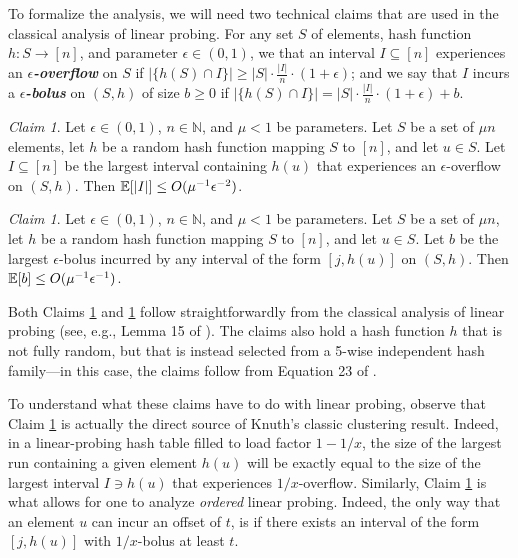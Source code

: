 \documentclass[10pt]{article}
\theoremstyle{remark}
\newtheorem{claim}[thm]{Claim}
\theoremstyle{remark}
\newcommand{\defn}[1]{\textbf{\emph{#1}}}
\begin{document}
To formalize the analysis, we will need two technical claims that are used in the classical analysis of linear probing. For any set $S$ of elements, hash function $h: S \rightarrow [n]$, and parameter $\epsilon \in (0, 1)$, we that an interval $I \subseteq [n]$ experiences an \defn{$\epsilon$-overflow} on $S$ if $|\{h(S) \cap I\}| \ge |S| \cdot \frac{|I|}{n} \cdot (1 + \epsilon)$; and we say that $I$ incurs a \defn{$\epsilon$-bolus} on $(S, h)$ of size $b \ge 0$ if $|\{h(S) \cap I\}| = |S| \cdot \frac{|I|}{n} \cdot (1 + \epsilon) + b$.


\begin{claim}
Let $\epsilon \in (0, 1)$, $n \in \mathbb{N}$, and $\mu < 1$ be parameters. Let $S$ be a set of $\mu n$ elements, let $h$ be a random hash function mapping $S$ to $[n]$, and let $u \in S$. Let $I \subseteq [n]$ be the largest interval containing $h(u)$ that experiences an $\epsilon$-overflow on $(S, h)$. Then $\mathbb{E}[|I|] \le O(\mu^{-1} \epsilon^{-2})$. 
\label{clm:largeinterval}
\end{claim}

\begin{claim}
Let $\epsilon \in (0, 1)$, $n \in \mathbb{N}$, and $\mu < 1$ be parameters. Let $S$ be a set of $\mu n$, let $h$ be a random hash function mapping $S$ to $[n]$, and let $u \in S$. Let $b$ be the largest $\epsilon$-bolus incurred by any interval of the form $[j, h(u)]$ on $(S, h)$. Then $\mathbb{E}[b] \le O(\mu^{-1} \epsilon^{-1})$. 
\label{clm:largebolus}
\end{claim}

Both Claims \ref{clm:largeinterval} and \ref{clm:largebolus} follow straightforwardly from the classical analysis of linear probing (see, e.g., Lemma 15 of \cite{us}). The claims also hold a hash function $h$ that is not fully random, but that is instead selected from a 5-wise independent hash family---in this case, the claims follow from Equation 23 of \cite{thorup}. 

To understand what these claims have to do with linear probing, observe that Claim \ref{clm:largeinterval} is actually the direct source of Knuth's classic clustering result. Indeed, in a linear-probing hash table filled to load factor $1 - 1/x$, the size of the largest run containing a given element $h(u)$ will be exactly equal to the size of the largest interval $I \ni h(u)$ that experiences $1/x$-overflow. Similarly, Claim \ref{clm:largebolus} is what allows for one to analyze \emph{ordered} linear probing. Indeed, the only way that an element $u$ can incur an offset of $t$, is if there exists an interval of the form $[j, h(u)]$ with $1/x$-bolus at least $t$.
\end{document}
